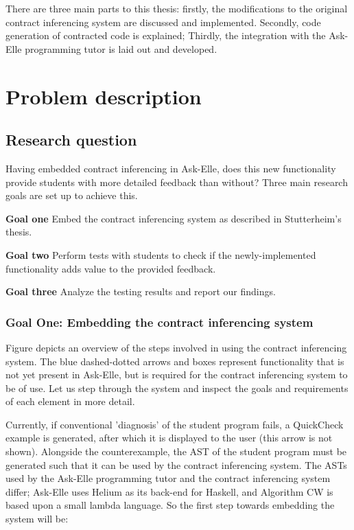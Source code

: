\documentclass[10pt]{report}
\begin{document}
There are three main parts to this thesis:
firstly, the modifications to the original contract inferencing system are discussed and implemented. Secondly, code generation of contracted code is explained; Thirdly, the integration with the Ask-Elle programming tutor is laid out and developed.

\chapter{Problem description}
\section{Research question}
Having embedded contract inferencing in Ask-Elle, does this new functionality provide students with more detailed feedback than without?
Three main research goals are set up to achieve this.

\begin{description}
	\item{\textbf{Goal one}} Embed the contract inferencing system as described in Stutterheim's thesis.
	\item{\textbf{Goal two}} Perform tests with students to check if the newly-implemented functionality adds value to the provided feedback.
	\item{\textbf{Goal three}} Analyze the testing results and report our findings.
\end{description}

\subsection{Goal One: Embedding the contract inferencing system}


Figure depicts an overview of the steps involved in using the contract inferencing system.
The blue dashed-dotted arrows and boxes represent functionality that is not yet present in Ask-Elle, but is required for the contract inferencing system to be of use.
Let us step through the system and inspect the goals and requirements of each element in more detail.

Currently, if conventional 'diagnosis' of the student program fails, a QuickCheck example is generated, after which it is displayed to the user (this arrow is not shown).
Alongside the counterexample, the AST of the student program must be generated such that it can be used by the contract inferencing system.
The ASTs used by the Ask-Elle programming tutor and the contract inferencing system differ; Ask-Elle uses Helium as its back-end for Haskell, and Algorithm CW is based upon a small lambda language. So the first step towards embedding the system will be:
\end{document}
